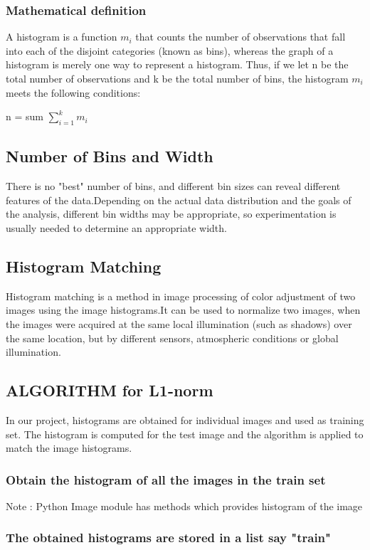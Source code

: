 \documentclass[10pt,a4paper]{article}
\begin{document}
\subsubsection{Mathematical definition}
A histogram is a function $m_i$ that counts the number of observations that fall into each of the disjoint categories (known as bins), whereas the graph of a histogram is merely one way to represent a histogram. Thus, if we let n be the total number of observations and k be the total number of bins, the histogram $m_i$ meets the following conditions:

    n = sum $\displaystyle\sum\limits_{i=1}^k m_i$ 
  
\subsection{Number of  Bins and Width}
There is no "best" number of bins, and different bin sizes can reveal different features of the data.Depending on the actual data distribution and the goals of the analysis, different bin widths may be appropriate, so experimentation is usually needed to determine an appropriate width.
   
\subsection{Histogram Matching}
Histogram matching is a method in image processing of color adjustment of two images using the image histograms.It can be used to normalize two images, when the images were acquired at the same local illumination (such as shadows) over the same location, but by different sensors, atmospheric conditions or global illumination.

\subsection{ALGORITHM for L1-norm}
In our project, histograms are obtained for individual images and used as training set. The histogram is computed for the test image and the algorithm is applied to match the image histograms.
\subsubsection{Obtain the histogram of all the images in the train set
}
Note : Python Image module has methods which provides histogram of the image \\

\subsubsection{The obtained histograms are stored in a list say "train"}
\end{document}
